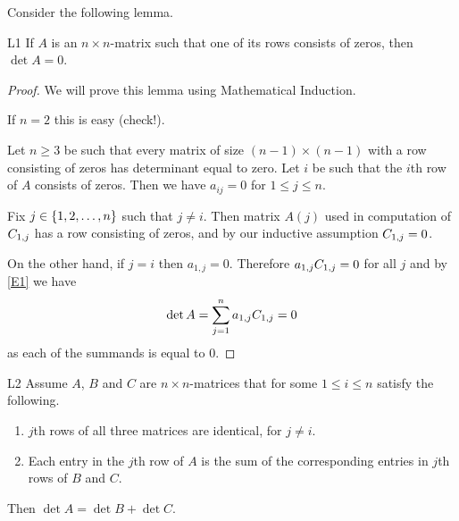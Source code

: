 Consider the following lemma.

\begin{lemma}{}{L1}
  If $A$ is an $n\times n$-matrix such that one of its rows consists
  of zeros, then $\det A=0$.
\end{lemma}

\begin{proof}
  We will prove this lemma using Mathematical Induction.

  If $n=2$ this is easy (check!).

  Let $n\geq 3$ be such that every matrix of size $(n-1)\times(n-1)$
  with a row consisting of zeros has determinant equal to zero.  Let
  $i$ be such that the $i$th row of $A$ consists of zeros.  Then we
  have $a_{ij}=0$ for $1\leq j\leq n$.

  Fix $j\in \set{1,2, \dots ,n}$ such that $j\neq i$. Then matrix
  $A(j)$ used in computation of $\cof{A}{1,j}$ has a row consisting of
  zeros, and by our inductive assumption $\cof{A}{1,j}=0$.

  On the other hand, if $j=i$ then $a_{1,j}=0$.  Therefore
  $a_{1,j}\cof{A}{1,j}=0$ for all $j$ and by \eqref{E1} we have
  \begin{equation*}
    \det A=\sum_{j=1}^n a_{1,j} \cof{A}{1,j}=0
  \end{equation*}
  as each of the summands is equal to 0.
\end{proof}

\begin{lemma}{}{L2}
  Assume $A$, $B$ and $C$ are $n\times n$-matrices that for some
  $1\leq i\leq n$ satisfy the following.
  \begin{enumerate}
  \item $j$th rows of all three matrices are identical, for $j\neq i$.

  \item Each entry in the $j$th row of $A$ is the sum of the
    corresponding entries in $j$th rows of $B$ and $C$.
  \end{enumerate}
  Then $\det A=\det B+\det C$.
\end{lemma}

